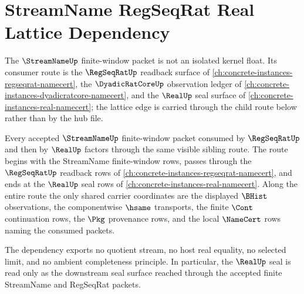 \section{StreamName RegSeqRat Real Lattice Dependency}
\label{sec:streamname-regseqrat-real-lattice-dependency}

The $\StreamNameUp$ finite-window packet is not an isolated kernel float. Its consumer route is the $\RegSeqRatUp$ readback surface of \autoref{ch:concrete-instances-regseqrat-namecert}, the $\DyadicRatCoreUp$ observation ledger of \autoref{ch:concrete-instances-dyadicratcore-namecert}, and the $\RealUp$ seal surface of \autoref{ch:concrete-instances-real-namecert}; the lattice edge is carried through the child route below rather than by the hub file.

\begin{theorem}
\label{thm:streamname-regseqrat-real-lattice-dependency}
Every accepted $\StreamNameUp$ finite-window packet consumed by $\RegSeqRatUp$ and then by $\RealUp$ factors through the same visible sibling route. The route begins with the StreamName finite-window rows, passes through the $\RegSeqRatUp$ readback rows of \autoref{ch:concrete-instances-regseqrat-namecert}, and ends at the $\RealUp$ seal rows of \autoref{ch:concrete-instances-real-namecert}. Along the entire route the only shared carrier coordinates are the displayed $\BHist$ observations, the componentwise $\hsame$ transports, the finite $\Cont$ continuation rows, the $\Pkg$ provenance rows, and the local $\NameCert$ rows naming the consumed packets.

The dependency exports no quotient stream, no host real equality, no selected limit, and no ambient completeness principle. In particular, the $\RealUp$ seal is read only as the downstream seal surface reached through the accepted finite StreamName and RegSeqRat packets.
\end{theorem}
